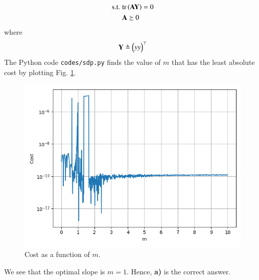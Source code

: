 \documentclass[journal,12pt,twocolumn]{IEEEtran}
\begin{document}
\begin{enumerate}
\begin{align}
        \textrm{s.t. } &\textrm{tr}\left(\mathbf{AY}\right) = 0 \label{eq:sd-constr} \\
                       &\mathbf{A} \succeq 0
    \end{align}
    where
    \begin{align}
        \mathbf{Y} \triangleq \begin{pmatrix}yy\end{pmatrix}^\top
    \end{align}
    The Python code \texttt{codes/sdp.py} finds the value of $m$ that 
    has the least absolute cost by plotting Fig. \ref{fig:sdp}. 
    \begin{figure}[!ht]
        \centering
        \includegraphics[width=\columnwidth]{figs/sdp.png}
        \caption{Cost as a function of $m$.}
        \label{fig:sdp}
    \end{figure}
    We see that the optimal slope is $m = 1$. Hence, \textbf{a)} is the
    correct answer.
\end{enumerate}
\end{document}
